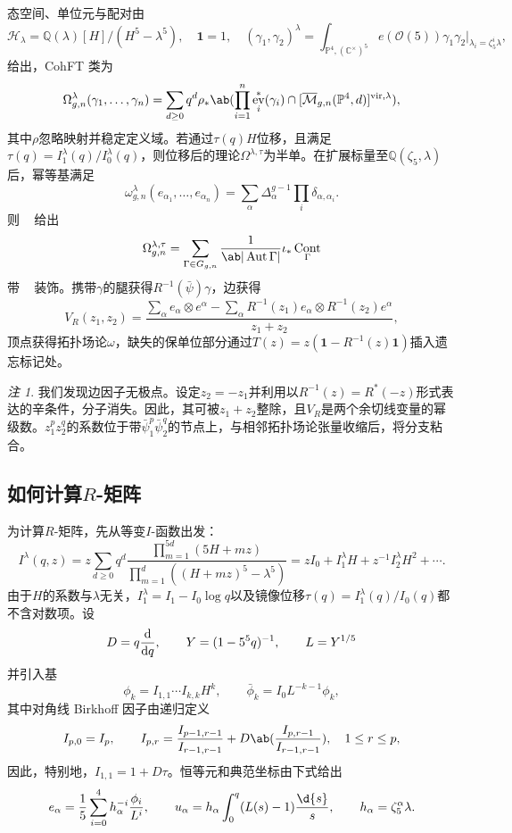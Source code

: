 \documentclass{amsart}
\theoremstyle{definition}
\theoremstyle{remark}
\newtheorem{rmk}[thm]{注}
\theoremstyle{plain}
\theoremstyle{definition}
\theoremstyle{remark}
\newcommand{\C}{\mathbb{C}}
\newcommand{\Q}{\mathbb{Q}}
\renewcommand{\P}{\mathbb{P}}
\newcommand{\Mbar}{\overline{\mathcal{M}}}
\newcommand{\mc}[1]{\mathcal{#1}}
\newcommand{\mr}[1]{\mathrm{#1}}
\newcommand{\1}{\mathbf{1}}
\newcommand{\2}{\mathbf{2}}
\newcommand{\3}{\mathbf{3}}
\newcommand{\vir}{\mr{vir}}
\DeclareMathOperator{\Aut}{Aut}
\DeclareMathOperator{\ev}{ev}
\DeclareMathOperator{\Cont}{Cont}
\begin{document}
态空间、单位元与配对由
\[ \mc{H}_{\lambda} = \Q(\lambda)[H]/(H^5-\lambda^5), \quad \1 = 1, \quad (\gamma_1,\gamma_2)^{\lambda} = \int_{\P^4, (\C^{\times})^5} e(\mc{O}(5))\gamma_1\gamma_2 \Big|_{\lambda_i = \zeta_5^i\lambda}, \]
给出，CohFT 类为
\[ \Omega^{\lambda}_{g,n}(\gamma_1, \ldots, \gamma_n) = \sum_{d \geq 0} q^d \rho_* \ab( \prod_{i=1}^n \ev_i^*(\gamma_i) \cap [\Mbar_{g,n}(\P^4,d)]^{\vir,\lambda}), \]
其中\(\rho\)忽略映射并稳定定义域。若通过\(\tau(q)H\)位移，且满足\(\tau(q) = I^{\lambda}_1(q)/I^{\lambda}_0(q)\)，则位移后的理论\(\Omega^{\lambda,\tau}\)为半单。在扩展标量至\(\Q(\zeta_5,\lambda)\)后，幂等基满足
\[ \omega^{\lambda}_{g,n}(e_{\alpha_1}, \ldots, e_{\alpha_n}) = \sum_{\alpha}\Delta_{\alpha}^{g-1}\prod_i \delta_{\alpha,\alpha_i}. \]
则 ~ 给出
\[ \Omega^{\lambda,\tau}_{g,n} = \sum_{\Gamma \in G_{g,n}} \frac{1}{\ab|\Aut\Gamma|}\iota_* \Cont_{\Gamma} \]
带 ~ 装饰。携带\(\gamma\)的腿获得\(R^{-1}(\bar{\psi})\gamma\)，边获得
\[ V_R(z_1,z_2) = \frac{\sum_{\alpha} e_{\alpha}\otimes e^{\alpha} - \sum_{\alpha} R^{-1}(z_1)e_{\alpha} \otimes R^{-1}(z_2)e^{\alpha}}{z_1+z_2}, \]
顶点获得拓扑场论\(\omega\)，缺失的保单位部分通过\(T(z) = z(\1 - R^{-1}(z)\1)\)插入遗忘标记处。

\begin{rmk}
我们发现边因子无极点。设定\(z_2 = -z_1\)并利用以\(R^{-1}(z) = R^*(-z)\)形式表达的辛条件，分子消失。因此，其可被\(z_1+z_2\)整除，且\(V_R\)是两个余切线变量的幂级数。\(z_1^p z_2^q\)的系数位于带\(\bar{\psi}_1^p \bar{\psi}_2^q\)的节点上，与相邻拓扑场论张量收缩后，将分支粘合。
\end{rmk}

\subsection{如何计算\(R\)-矩阵}%
\label{sub:How to compute the R-matrix (Guo)}

为计算\(R\)-矩阵，先从等变\(I\)-函数出发：
\[ I^{\lambda}(q,z) = z\sum_{d\geq0}q^d \frac{\prod_{m=1}^{5d}(5H+mz)}{\prod_{m=1}^d ((H+mz)^5 - \lambda^5)} = zI_0 + I_1^{\lambda}H + z^{-1}I_2^{\lambda}H^2 + \cdots. \]
由于\(H\)的系数与\(\lambda\)无关，\(I_1^{\lambda} = I_1 - I_0 \log q\)以及镜像位移\(\tau(q) = I_1^{\lambda}(q)/I_0(q)\)都不含对数项。设
\[ D = q\odv{}{q}, \qquad Y = (1-5^5q)^{-1}, \qquad L = Y^{1/5} \]
并引入基
\[ \phi_k = I_{1,1}\cdots I_{k,k}H^k, \qquad \bar{\phi}_k = I_0 L^{-k-1}\phi_k, \]
其中对角线 Birkhoff 因子由递归定义
\[ I_{p,0} = I_p, \qquad I_{p,r} = \frac{I_{p-1,r-1}}{I_{r-1,r-1}} + D \ab( \frac{I_{p,r-1}}{I_{r-1,r-1}}), \quad 1 \leq r \leq p, \]
因此，特别地，\(I_{1,1} = 1+D\tau\)。恒等元和典范坐标由下式给出
\[ e_{\alpha} = \frac{1}{5}\sum_{i=0}^4 h_{\alpha}^{-i}\frac{\phi_i}{L^i}, \qquad u_{\alpha} = h_{\alpha}\int_0^q (L(s)-1)\frac{\d{s}}{s}, \qquad h_{\alpha} = \zeta_5^{\alpha}\lambda. \]
\end{document}
